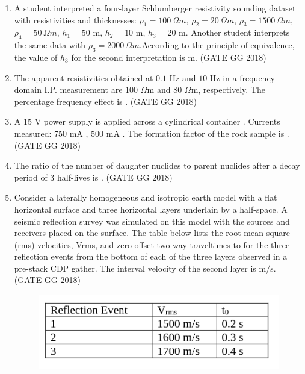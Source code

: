 \documentclass[journal]{IEEEtran}
\begin{document}
\begin{enumerate}[start=1]
\item A student interpreted a four-layer Schlumberger resistivity sounding dataset with resistivities and thicknesses:  
$\rho_1=100\,\Omega m$, $\rho_2=20\,\Omega m$, $\rho_3=1500\,\Omega m$, $\rho_4=50\,\Omega m$, $h_1=50$ m, $h_2=10$ m, $h_3=20$ m. Another student interprets the same data with $\rho_3=2000\,\Omega m$.According to the principle of equivalence, the value of $h_3$ for the second interpretation is \makebox[2cm]{\hrulefill} m.
\hspace*{15.7cm}(GATE GG 2018)
\vspace{0.5cm}

\item The apparent resistivities obtained at $0.1$ Hz and $10$ Hz in a frequency domain I.P. measurement are  $100$ $\Omega$m and $80$ $\Omega$m, respectively.  
The percentage frequency effect is \makebox[2cm]{\hrulefill}.
\hfill(GATE GG 2018)
\vspace{0.5cm}

\item A $15$ V power supply is applied across a cylindrical container . Currents measured: $750$ mA , $500$ mA .  The formation factor of the rock sample is \makebox[2cm]{\hrulefill}.
\hspace*{15.7cm}(GATE GG 2018)
\vspace{0.5cm}

\item The ratio of the number of daughter nuclides to parent nuclides after a decay period of $3$ half-lives is \makebox[2cm]{\hrulefill}.
\hspace*{15.7cm}(GATE GG 2018)
\vspace{0.5cm}

\item Consider a laterally homogeneous and isotropic earth model with a flat horizontal surface and three horizontal layers underlain by a half-space. A seismic reflection survey was simulated on this model with the sources and receivers placed on the surface. The table below lists the root mean square (rms) velocities, Vrms, and zero-offset two-way traveltimes to for the three reflection events from the bottom of each of the three layers observed in a pre-stack CDP  gather. The interval velocity of the second layer is m/s.
\hfill(GATE GG 2018)
\begin{figure}[H]
        \centering
        \includegraphics[width=0.5\columnwidth]{figs/12.png}
        \caption*{}
        \label{fig:q10}
    \end{figure}


\end{enumerate}
\end{document}
